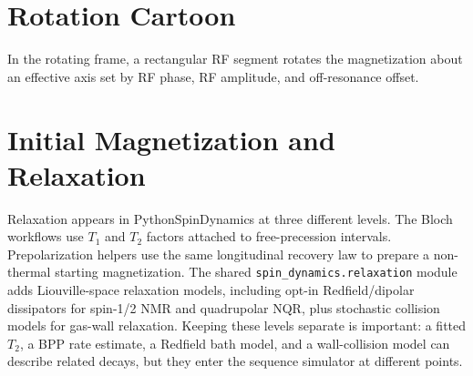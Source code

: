\documentclass[11pt,oneside]{report}
\newcommand{\code}[1]{\texttt{#1}}
\begin{document}
\section{Rotation Cartoon}

In the rotating frame, a rectangular RF segment rotates the magnetization about
an effective axis set by RF phase, RF amplitude, and off-resonance offset.

\begin{center}
\end{center}

\section{Initial Magnetization and Relaxation}

Relaxation appears in PythonSpinDynamics at three different levels. The Bloch
workflows use \(T_1\) and \(T_2\) factors attached to free-precession intervals.
Prepolarization helpers use the same longitudinal recovery law to prepare a
non-thermal starting magnetization. The shared
\code{spin\_dynamics.relaxation} module adds Liouville-space relaxation models,
including opt-in Redfield/dipolar dissipators for spin-1/2 NMR and quadrupolar
NQR, plus stochastic collision models for gas-wall relaxation. Keeping these
levels separate is important: a fitted \(T_2\), a BPP rate estimate, a Redfield
bath model, and a wall-collision model can describe related decays, but they
enter the sequence simulator at different points.
\end{document}
